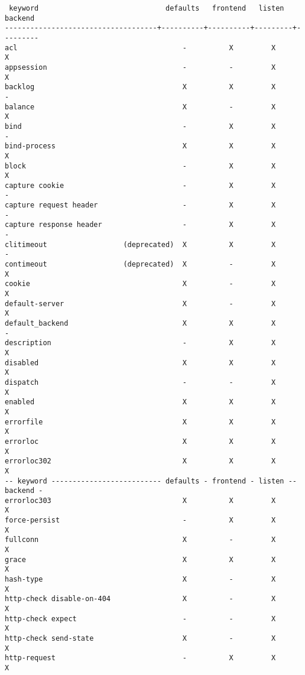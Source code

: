 \begin{verbatim}
 keyword                              defaults   frontend   listen    backend
------------------------------------+----------+----------+---------+---------
acl                                       -          X         X         X
appsession                                -          -         X         X
backlog                                   X          X         X         -
balance                                   X          -         X         X
bind                                      -          X         X         -
bind-process                              X          X         X         X
block                                     -          X         X         X
capture cookie                            -          X         X         -
capture request header                    -          X         X         -
capture response header                   -          X         X         -
clitimeout                  (deprecated)  X          X         X         -
contimeout                  (deprecated)  X          -         X         X
cookie                                    X          -         X         X
default-server                            X          -         X         X
default_backend                           X          X         X         -
description                               -          X         X         X
disabled                                  X          X         X         X
dispatch                                  -          -         X         X
enabled                                   X          X         X         X
errorfile                                 X          X         X         X
errorloc                                  X          X         X         X
errorloc302                               X          X         X         X
-- keyword -------------------------- defaults - frontend - listen -- backend -
errorloc303                               X          X         X         X
force-persist                             -          X         X         X
fullconn                                  X          -         X         X
grace                                     X          X         X         X
hash-type                                 X          -         X         X
http-check disable-on-404                 X          -         X         X
http-check expect                         -          -         X         X
http-check send-state                     X          -         X         X
http-request                              -          X         X         X

\end{verbatim}
